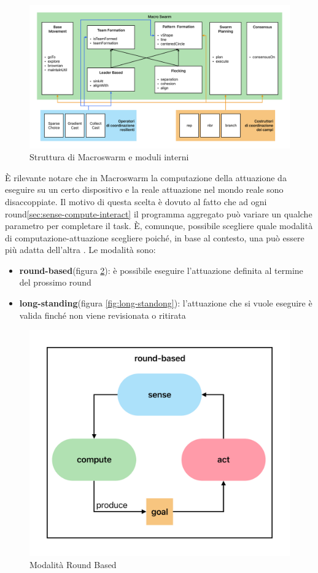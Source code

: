 \documentclass[12pt,a4paper,openright,twoside]{book}
\begin{document}
\begin{figure}
    \centering
    \includegraphics[width=.99\linewidth]{figures/macroSwarm-modeles.pdf}
    \caption{Struttura di Macroswarm e moduli interni}
    \label{fig:macro-swarm-int}
\end{figure}

È rilevante notare che in Macroswarm la computazione della attuazione da eseguire su un certo dispositivo e la reale attuazione nel mondo reale sono disaccoppiate. Il motivo di questa scelta è dovuto al fatto che ad ogni round\cref{sec:sense-compute-interact} il programma aggregato può variare un qualche parametro per completare il task. È, comunque, possibile scegliere quale modalità di computazione-attuazione scegliere poiché, in base al contesto, una può essere più adatta dell'altra \cite{Macroswarm}. Le modalità sono:

\begin{itemize}
    \item \textbf{round-based}(figura \ref{fig:round-based}): è possibile eseguire l'attuazione definita al termine del prossimo round 
    \item \textbf{long-standing}(figura \ref{fig:long-standong}): l'attuazione che si vuole eseguire è valida finché non viene revisionata o ritirata
\end{itemize}

\begin{figure}
    \centering
    \includegraphics[width=.6\linewidth]{figures/round-based.pdf}
    \caption{Modalità Round Based}
    \label{fig:round-based}
\end{figure}
\end{document}
